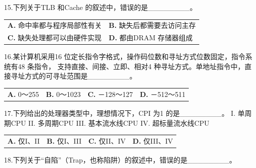 \documentclass[UTF8,11pt]{ctexart}
\begin{document}
15.下列关于TLB 和Cache 的叙述中，错误的是\_\_\_\_\_\_\_\_。


\begin{center}\begin{tabular}{>{\raggedright\arraybackslash}p{\dimexpr(\linewidth-4\tabcolsep)/2\relax}>{\raggedright\arraybackslash}p{\dimexpr(\linewidth-4\tabcolsep)/2\relax}}
\textbf{A.} 命中率都与程序局部性有关 & \textbf{B.} 缺失后都需要去访问主存\\[.35em]
\textbf{C.} 缺失处理都可以由硬件实现 & \textbf{D.} 都由DRAM 存储器组成\\[.35em]\end{tabular}\end{center}

16.某计算机采用16 位定长指令字格式，操作码位数和寻址方式位数固定，指令系统有48 条指令， 支持直接、间接、立即、相对4 种寻址方式。单地址指令中，直接寻址方式的可寻址范围是\_\_\_\_\_\_\_\_。


\begin{center}\begin{tabular}{>{\raggedright\arraybackslash}p{\dimexpr(\linewidth-8\tabcolsep)/4\relax}>{\raggedright\arraybackslash}p{\dimexpr(\linewidth-8\tabcolsep)/4\relax}>{\raggedright\arraybackslash}p{\dimexpr(\linewidth-8\tabcolsep)/4\relax}>{\raggedright\arraybackslash}p{\dimexpr(\linewidth-8\tabcolsep)/4\relax}}
\textbf{A.} 0～255 & \textbf{B.} 0～1023 & \textbf{C.} －128～127 & \textbf{D.} －512～511\\[.35em]\end{tabular}\end{center}

17.下列给出的处理器类型中，理想情况下，CPI 为1 的是\_\_\_\_\_\_\_\_。 I. 单周期CPU II. 多周期CPU III. 基本流水线CPU IV. 超标量流水线CPU


\begin{center}\begin{tabular}{>{\raggedright\arraybackslash}p{\dimexpr(\linewidth-8\tabcolsep)/4\relax}>{\raggedright\arraybackslash}p{\dimexpr(\linewidth-8\tabcolsep)/4\relax}>{\raggedright\arraybackslash}p{\dimexpr(\linewidth-8\tabcolsep)/4\relax}>{\raggedright\arraybackslash}p{\dimexpr(\linewidth-8\tabcolsep)/4\relax}}
\textbf{A.} 仅I、II & \textbf{B.} 仅I、III & \textbf{C.} 仅II、IV & \textbf{D.} 仅III、IV\\[.35em]\end{tabular}\end{center}

18.下列关于“自陷”（Trap，也称陷阱）的叙述中，错误的是\_\_\_\_\_\_\_\_。
\end{document}
